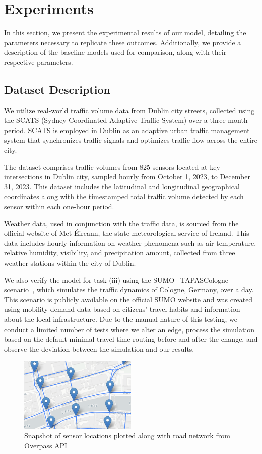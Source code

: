 \section{Experiments}\label{sec:experiments}
In this section, we present the experimental results of our model, detailing the parameters necessary to replicate these outcomes. Additionally, we provide a description of the baseline models used for comparison, along with their respective parameters.

\subsection{Dataset Description}

We utilize real-world traffic volume data from Dublin city streets, collected using the SCATS (Sydney Coordinated Adaptive Traffic System) over a three-month period. SCATS is employed in Dublin as an adaptive urban traffic management system that synchronizes traffic signals and optimizes traffic flow across the entire city.

The dataset comprises traffic volumes from 825 sensors located at key intersections in Dublin city, sampled hourly from October 1, 2023, to December 31, 2023. This dataset includes the latitudinal and longitudinal geographical coordinates along with the timestamped total traffic volume detected by each sensor within each one-hour period.

Weather data, used in conjunction with the traffic data, is sourced from the official website of Met Éireann, the state meteorological service of Ireland. This data includes hourly information on weather phenomena such as air temperature, relative humidity, visibility, and precipitation amount, collected from three weather stations within the city of Dublin.

We also verify the model for task (iii) using the SUMO~\cite{sumo} TAPASCologne scenario~\cite{tapas}, which simulates the traffic dynamics of Cologne, Germany, over a day. This scenario is publicly available on the official SUMO website and was created using mobility demand data based on citizens' travel habits and information about the local infrastructure. Due to the manual nature of this testing, we conduct a limited number of tests where we alter an edge, process the simulation based on the default minimal travel time routing before and after the change, and observe the deviation between the simulation and our results.

\begin{figure}[htbp]
  \centering
  \includegraphics[width=0.5\textwidth]{dataset.png}
  \caption{Snapshot of sensor locations plotted along with road network from Overpass API}
  \label{fig:dataset}
\end{figure}


